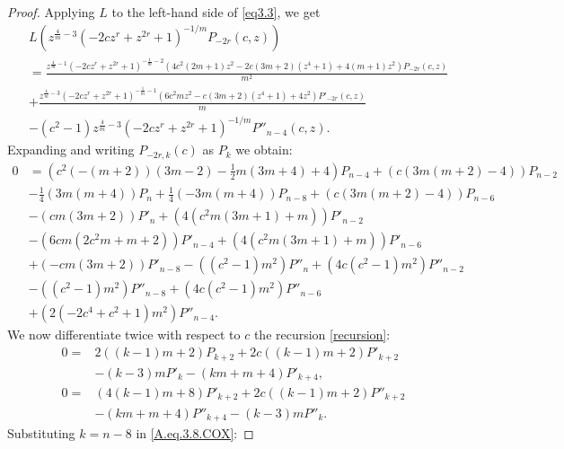 \documentclass[final,nopreprintline]{elsarticle}
\theoremstyle{definition}
\numberwithin{equation}{section}
\theoremstyle{remark}
\begin{document}
\begin{proof}
Applying $L$ to the left-hand side of \eqref{eq3.3}, we get
\begin{align*}
    &L \left(z^{\frac{4}{m}-3} \left(-2 c z^{r}+z^{2r}+1\right)^{-1/m} P_{-2r}(c,z)\right)\\
    &=\frac{z^{\frac{4}{m}-1} \left(-2 c z^{r}+z^{2r}+1\right)^{-\frac{1}{m}-2} \left(4 c^2 (2 m+1) z^2-2 c (3 m+2) \left(z^4+1\right)+4 (m+1) z^2\right) P_{-2r}(c,z)}{m^2}\\
    &+\frac{z^{\frac{4}{m}-3} \left(-2 c z^{r}+z^{2r}+1\right)^{-\frac{1}{m}-1} \left(6 c^2 m z^2-c (3 m+2) \left(z^4+1\right)+4 z^2\right) P'_{-2r}(c,z)}{m}\\
    &-\left(c^2-1\right) z^{\frac{4}{m}-3} \left(-2 c z^{r}+z^{2r}+1\right)^{-1/m} P''_{n-4}(c,z).
\end{align*}
Expanding and writing $P_{-2r,k}(c)$ as $P_k$ we obtain:
\begin{align}
    0&=\left(c^2 (-(m+2)) (3 m-2)-\frac{1}{2} m (3 m+4)+4\right) P_{n-4} +(c (3 m (m+2)-4)) P_{n-2} \nonumber\\
    &-\frac{1}{4} (3 m (m+4)) P_n +\frac{1}{4} (-3 m (m+4)) P_{n-8} +(c (3 m (m+2)-4)) P_{n-6} \nonumber\\
    &-(c m (3 m+2)) P'_n +\left(4 \left(c^2 m (3 m+1)+m\right)\right) P'_{n-2} \nonumber\\
    &-\left(6 c m \left(2 c^2 m+m+2\right)\right) P'_{n-4} +\left(4 \left(c^2 m (3 m+1)+m\right)\right) P'_{n-6} \nonumber\\
    &+(-c m (3 m+2)) P'_{n-8} -\left(\left(c^2-1\right) m^2\right) P''_n +\left(4 c \left(c^2-1\right) m^2\right) P''_{n-2} \nonumber\\
    &-\left(\left(c^2-1\right) m^2\right) P''_{n-8} +\left(4 c \left(c^2-1\right) m^2\right) P''_{n-6} \nonumber\\
    &+\left(2 \left(-2 c^4+c^2+1\right) m^2\right) P''_{n-4}. \label{A.eq.3.5.COX}
\end{align}
We now differentiate twice with respect to $c$ the recursion \eqref{recursion}:
\begin{align}
    0=&2 ((k-1) m+2) P_{k+2} +2 c ((k-1) m+2) P'_{k+2} \nonumber\\
    &-(k-3) m P'_k -(k m+m+4) P'_{k+4}, \label{A.eq.3.7.COX}\\
    0=&(4 (k-1) m+8) P'_{k+2} +2 c ((k-1) m+2) P''_{k+2} \nonumber\\
    &-(k m+m+4) P''_{k+4} -(k-3) m P''_k. \label{A.eq.3.8.COX}
\end{align}
Substituting $k=n-8$ in \eqref{A.eq.3.8.COX}:

\end{proof}
\end{document}
